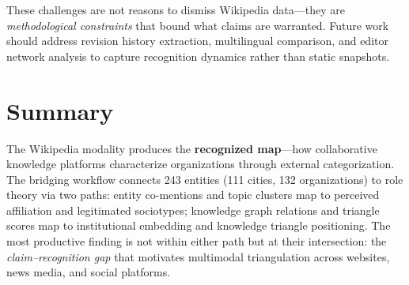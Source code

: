 \documentclass[../main.tex]{subfiles}
\begin{document}
These challenges are not reasons to dismiss Wikipedia data---they are
\emph{methodological constraints} that bound what claims are warranted.
Future work should address revision history extraction, multilingual
comparison, and editor network analysis to capture recognition dynamics
rather than static snapshots.


\section{Summary}

\begin{summarybox}
The Wikipedia modality produces the \textbf{recognized map}---how collaborative
knowledge platforms characterize organizations through external categorization.
The bridging workflow connects 243 entities (111 cities, 132 organizations)
to role theory via two paths: entity co-mentions and topic clusters map to
perceived affiliation and legitimated sociotypes; knowledge graph relations
and triangle scores map to institutional embedding and knowledge triangle
positioning.
The most productive finding is not within either path but at their intersection:
the \emph{claim--recognition gap} that motivates multimodal triangulation
across websites, news media, and social platforms.
\end{summarybox}

\clearpage
{}
\end{document}
